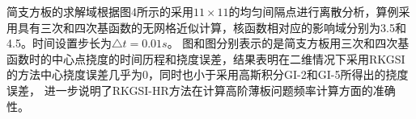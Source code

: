 \documentclass[a4paper]{article}
\begin{document}
\begin{figure}[!h]
\begin{floatrow}
\end{floatrow}
\end{figure}
简支方板的求解域根据图4所示的采用$11\times 11$的均匀间隔点进行离散分析，算例采用具有三次和四次基函数的无网格近似计算，核函数相对应的影响域分别为3.5和4.5。时间设置步长为$\triangle t=0.01s$。
图和图分别表示的是简支方板用三次和四次基函数时的中心点挠度的时间历程和挠度误差，结果表明在二维情况下采用RKGSI的方法中心挠度误差几乎为0，同时也小于采用高斯积分GI-2和GI-5所得出的挠度误差，
进一步说明了RKGSI-HR方法在计算高阶薄板问题频率计算方面的准确性。


\end{document}
